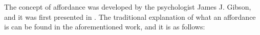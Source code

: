 \documentclass[11pt,fleqn,openany]{book} %
\begin{document}

The concept of affordance was developed by the psychologist James J. Gibson, and it was first presented in \cite{gibson1966senses}. The traditional explanation of what an affordance is can be found in the aforementioned work, and it is as follows:
\end{document}
